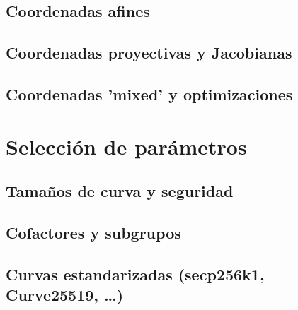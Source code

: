 \subsection{Coordenadas afines}
\subsection{Coordenadas proyectivas y Jacobianas}
\subsection{Coordenadas 'mixed' y optimizaciones}

\section{Selección de parámetros}
\subsection{Tamaños de curva y seguridad}
\subsection{Cofactores y subgrupos}
\subsection{Curvas estandarizadas (secp256k1, Curve25519, …)}